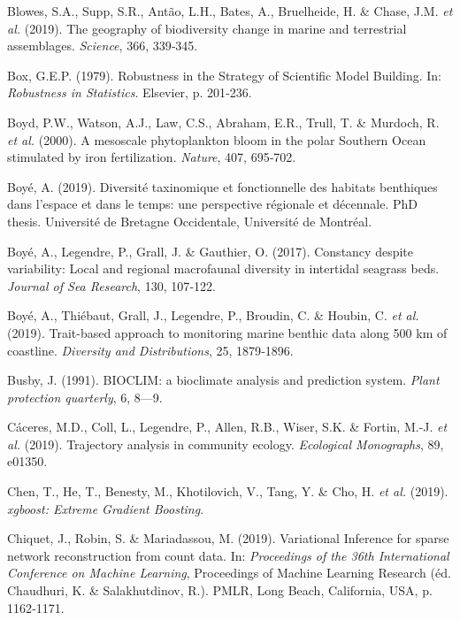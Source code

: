 \documentclass[12pt,]{article}
\newlength{\cslhangindent}
\newenvironment{cslreferences}%
  {\setlength{\parindent}{0pt}%
  \everypar{\setlength{\hangindent}{\cslhangindent}}\ignorespaces}%
  {\par}
\begin{document}
\begin{cslreferences}
\leavevmode\hypertarget{ref-Blowes_2019}{}%
Blowes, S.A., Supp, S.R., Antão, L.H., Bates, A., Bruelheide, H. \&
Chase, J.M. \emph{et al.} (2019). The geography of biodiversity change
in marine and terrestrial assemblages. \emph{Science}, 366, 339‑345.

\leavevmode\hypertarget{ref-Box_1979}{}%
Box, G.E.P. (1979). Robustness in the Strategy of Scientific Model
Building. In: \emph{Robustness in Statistics}. Elsevier, p. 201‑236.

\leavevmode\hypertarget{ref-Boyd_2000}{}%
Boyd, P.W., Watson, A.J., Law, C.S., Abraham, E.R., Trull, T. \&
Murdoch, R. \emph{et al.} (2000). A mesoscale phytoplankton bloom in the
polar Southern Ocean stimulated by iron fertilization. \emph{Nature},
407, 695‑702.

\leavevmode\hypertarget{ref-Boye_2019b}{}%
Boyé, A. (2019). Diversité taxinomique et fonctionnelle des habitats
benthiques dans l'espace et dans le temps: une perspective régionale et
décennale. PhD thesis. Université de Bretagne Occidentale, Université de
Montréal.

\leavevmode\hypertarget{ref-Boye_2017}{}%
Boyé, A., Legendre, P., Grall, J. \& Gauthier, O. (2017). Constancy
despite variability: Local and regional macrofaunal diversity in
intertidal seagrass beds. \emph{Journal of Sea Research}, 130, 107‑122.

\leavevmode\hypertarget{ref-Boye_2019a}{}%
Boyé, A., Thiébaut, Grall, J., Legendre, P., Broudin, C. \& Houbin, C.
\emph{et al.} (2019). Trait-based approach to monitoring marine benthic
data along 500 km of coastline. \emph{Diversity and Distributions}, 25,
1879‑1896.

\leavevmode\hypertarget{ref-Busby_1991}{}%
Busby, J. (1991). BIOCLIM: a bioclimate analysis and prediction system.
\emph{Plant protection quarterly}, 6, 8---9.

\leavevmode\hypertarget{ref-De_Caceres_2019}{}%
Cáceres, M.D., Coll, L., Legendre, P., Allen, R.B., Wiser, S.K. \&
Fortin, M.-J. \emph{et al.} (2019). Trajectory analysis in community
ecology. \emph{Ecological Monographs}, 89, e01350.

\leavevmode\hypertarget{ref-Chen_2019}{}%
Chen, T., He, T., Benesty, M., Khotilovich, V., Tang, Y. \& Cho, H.
\emph{et al.} (2019). \emph{xgboost: Extreme Gradient Boosting}.

\leavevmode\hypertarget{ref-Chiquet_2019}{}%
Chiquet, J., Robin, S. \& Mariadassou, M. (2019). Variational Inference
for sparse network reconstruction from count data. In: \emph{Proceedings
of the 36th International Conference on Machine Learning}, Proceedings
of Machine Learning Research (éd. Chaudhuri, K. \& Salakhutdinov, R.).
PMLR, Long Beach, California, USA, p. 1162‑1171.


\end{cslreferences}
\end{document}
